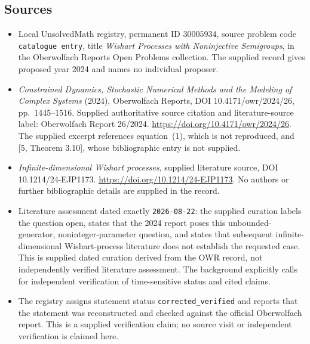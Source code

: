 \documentclass[11pt]{article}
\begin{document}
\subsection{Sources}
\begin{itemize}
\item Local UnsolvedMath registry, permanent ID \(30005934\), source problem code \texttt{catalogue entry}, title \emph{Wishart Processes with Noninjective Semigroups}, in the Oberwolfach Reports Open Problems collection. The supplied record gives proposed year 2024 and names no individual proposer.
\item \emph{Constrained Dynamics, Stochastic Numerical Methods and the Modeling of Complex Systems} (2024), Oberwolfach Reports, DOI 10.4171/owr/2024/26, pp.\ 1445--1516. Supplied authoritative source citation and literature-source label: Oberwolfach Report 26/2024. \url{https://doi.org/10.4171/owr/2024/26}. The supplied excerpt references equation~(1), which is not reproduced, and [5, Theorem 3.10], whose bibliographic entry is not supplied.
\item \emph{Infinite-dimensional Wishart processes}, supplied literature source, DOI 10.1214/24-EJP1173. \url{https://doi.org/10.1214/24-EJP1173}. No authors or further bibliographic details are supplied in the record.
\item Literature assessment dated exactly \texttt{2026-08-22}: the supplied curation labels the question open, states that the 2024 report poses this unbounded-generator, noninteger-parameter question, and states that subsequent infinite-dimensional Wishart-process literature does not establish the requested case. This is supplied dated curation derived from the OWR record, not independently verified literature assessment. The background explicitly calls for independent verification of time-sensitive status and cited claims.
\item The registry assigns statement status \texttt{corrected\_verified} and reports that the statement was reconstructed and checked against the official Oberwolfach report. This is a supplied verification claim; no source visit or independent verification is claimed here.
\end{itemize}
\end{document}

